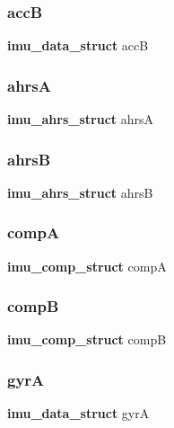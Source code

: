 \mbox{\label{imu_8h_a4a41c02b40d11801bcdd3bb56b65b87e}} 
\subsubsection{accB}
{\footnotesize\ttfamily \textbf{ imu\+\_\+data\+\_\+struct} accB}

\mbox{\label{imu_8h_a25ce0da4f90ef2a361ec288abf61cb51}} 
\subsubsection{ahrsA}
{\footnotesize\ttfamily \textbf{ imu\+\_\+ahrs\+\_\+struct} ahrsA}

\mbox{\label{imu_8h_ab15b471cacecb67b1bcbe47fb3dd1aac}} 
\subsubsection{ahrsB}
{\footnotesize\ttfamily \textbf{ imu\+\_\+ahrs\+\_\+struct} ahrsB}

\mbox{\label{imu_8h_a886767b19a32635ad9a205ed34a84d80}} 
\subsubsection{compA}
{\footnotesize\ttfamily \textbf{ imu\+\_\+comp\+\_\+struct} compA}

\mbox{\label{imu_8h_ae4aa005f5082a20c54299bbb3613f8bc}} 
\subsubsection{compB}
{\footnotesize\ttfamily \textbf{ imu\+\_\+comp\+\_\+struct} compB}

\mbox{\label{imu_8h_ad7cfa4ada6f213313cee6852b341574e}} 
\subsubsection{gyrA}
{\footnotesize\ttfamily \textbf{ imu\+\_\+data\+\_\+struct} gyrA}

\mbox{\label{imu_8h_adbc7b9708982492558a020985452f2bd}} 
